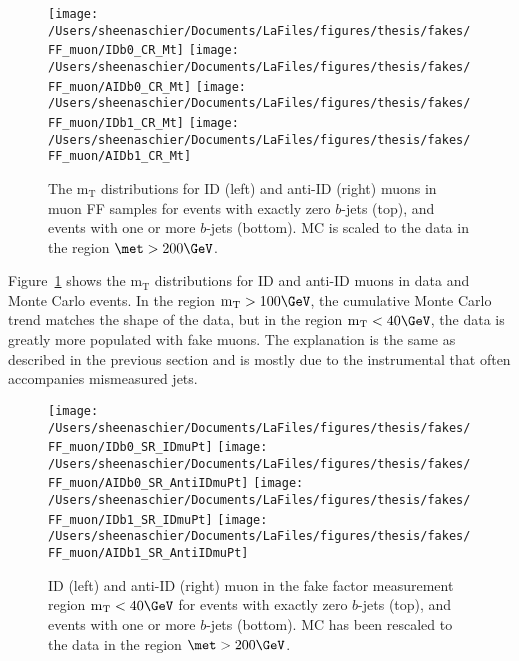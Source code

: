 \begin{figure}[tbp]
  \centering
  \texttt{[image: /Users/sheenaschier/Documents/LaFiles/figures/thesis/fakes/FF\_muon/IDb0\_CR\_Mt]}
    \texttt{[image: /Users/sheenaschier/Documents/LaFiles/figures/thesis/fakes/FF\_muon/AIDb0\_CR\_Mt]}
  \texttt{[image: /Users/sheenaschier/Documents/LaFiles/figures/thesis/fakes/FF\_muon/IDb1\_CR\_Mt]}
  \texttt{[image: /Users/sheenaschier/Documents/LaFiles/figures/thesis/fakes/FF\_muon/AIDb1\_CR\_Mt]}
  \caption{The $\mathrm{m_T}$ distributions for ID (left) and anti-ID (right) muons in muon FF samples for events with exactly zero $b$-jets (top), and events with one or more $b$-jets (bottom).  MC is scaled to the data in the region $\met > 200\GeV$.}
  \label{fig:ff_muon_mt}
\end{figure}
Figure~\ref{fig:ff_muon_mt} shows the $\mathrm{m_T}$ distributions for ID and anti-ID muons in data and Monte Carlo events.  In the region $\mathrm{m_T}> 100\GeV$, the cumulative Monte Carlo trend matches the shape of the data, but in the region $\mathrm{m_T}<40\GeV$, the data is greatly more populated with fake muons.  The explanation is the same as described in the previous section and is mostly due to the instrumental \met that often accompanies mismeasured jets. 

\begin{figure}[tbp]
  \centering
  \texttt{[image: /Users/sheenaschier/Documents/LaFiles/figures/thesis/fakes/FF\_muon/IDb0\_SR\_IDmuPt]}
  \texttt{[image: /Users/sheenaschier/Documents/LaFiles/figures/thesis/fakes/FF\_muon/AIDb0\_SR\_AntiIDmuPt]}
    \texttt{[image: /Users/sheenaschier/Documents/LaFiles/figures/thesis/fakes/FF\_muon/IDb1\_SR\_IDmuPt]}
  \texttt{[image: /Users/sheenaschier/Documents/LaFiles/figures/thesis/fakes/FF\_muon/AIDb1\_SR\_AntiIDmuPt]}
          \caption{ID (left) and anti-ID (right) muon \pt{} in the fake factor measurement region $\mathrm{m_T} < 40\GeV$ for events with exactly zero $b$-jets (top), and events with one or more $b$-jets (bottom).  MC has been rescaled to the data in the region $\met > 200\GeV$.}
  \label{fig:muon_FF_dists_pt}
\end{figure}

